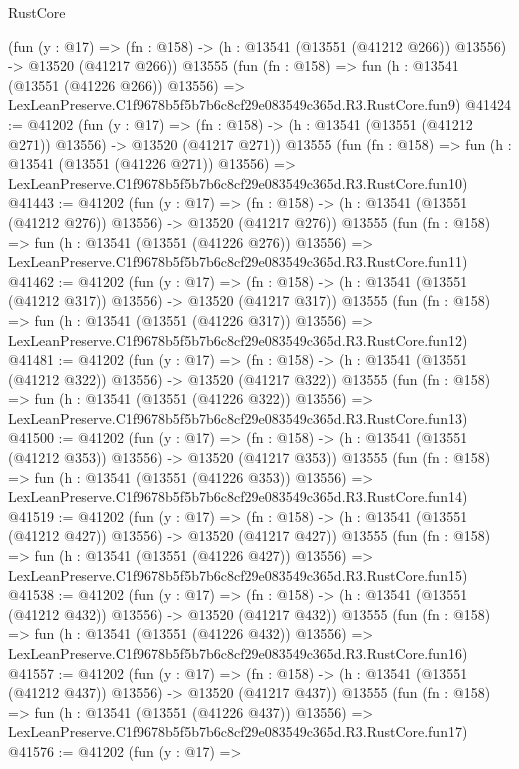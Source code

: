 \begin{lexlean}{RustCore}
\begin{coremodule}
    (fun (y : @17) =>
    (fn : @158) -> (h : @13541 (@13551 (@41212 @266)) @13556) -> @13520 (@41217 @266))
    @13555
    (fun (fn : @158) =>
    fun (h : @13541 (@13551 (@41226 @266)) @13556) =>
    LexLeanPreserve.C1f9678b5f5b7b6c8cf29e083549c365d.R3.RustCore.fun9)
@41424 := @41202
    (fun (y : @17) =>
    (fn : @158) -> (h : @13541 (@13551 (@41212 @271)) @13556) -> @13520 (@41217 @271))
    @13555
    (fun (fn : @158) =>
    fun (h : @13541 (@13551 (@41226 @271)) @13556) =>
    LexLeanPreserve.C1f9678b5f5b7b6c8cf29e083549c365d.R3.RustCore.fun10)
@41443 := @41202
    (fun (y : @17) =>
    (fn : @158) -> (h : @13541 (@13551 (@41212 @276)) @13556) -> @13520 (@41217 @276))
    @13555
    (fun (fn : @158) =>
    fun (h : @13541 (@13551 (@41226 @276)) @13556) =>
    LexLeanPreserve.C1f9678b5f5b7b6c8cf29e083549c365d.R3.RustCore.fun11)
@41462 := @41202
    (fun (y : @17) =>
    (fn : @158) -> (h : @13541 (@13551 (@41212 @317)) @13556) -> @13520 (@41217 @317))
    @13555
    (fun (fn : @158) =>
    fun (h : @13541 (@13551 (@41226 @317)) @13556) =>
    LexLeanPreserve.C1f9678b5f5b7b6c8cf29e083549c365d.R3.RustCore.fun12)
@41481 := @41202
    (fun (y : @17) =>
    (fn : @158) -> (h : @13541 (@13551 (@41212 @322)) @13556) -> @13520 (@41217 @322))
    @13555
    (fun (fn : @158) =>
    fun (h : @13541 (@13551 (@41226 @322)) @13556) =>
    LexLeanPreserve.C1f9678b5f5b7b6c8cf29e083549c365d.R3.RustCore.fun13)
@41500 := @41202
    (fun (y : @17) =>
    (fn : @158) -> (h : @13541 (@13551 (@41212 @353)) @13556) -> @13520 (@41217 @353))
    @13555
    (fun (fn : @158) =>
    fun (h : @13541 (@13551 (@41226 @353)) @13556) =>
    LexLeanPreserve.C1f9678b5f5b7b6c8cf29e083549c365d.R3.RustCore.fun14)
@41519 := @41202
    (fun (y : @17) =>
    (fn : @158) -> (h : @13541 (@13551 (@41212 @427)) @13556) -> @13520 (@41217 @427))
    @13555
    (fun (fn : @158) =>
    fun (h : @13541 (@13551 (@41226 @427)) @13556) =>
    LexLeanPreserve.C1f9678b5f5b7b6c8cf29e083549c365d.R3.RustCore.fun15)
@41538 := @41202
    (fun (y : @17) =>
    (fn : @158) -> (h : @13541 (@13551 (@41212 @432)) @13556) -> @13520 (@41217 @432))
    @13555
    (fun (fn : @158) =>
    fun (h : @13541 (@13551 (@41226 @432)) @13556) =>
    LexLeanPreserve.C1f9678b5f5b7b6c8cf29e083549c365d.R3.RustCore.fun16)
@41557 := @41202
    (fun (y : @17) =>
    (fn : @158) -> (h : @13541 (@13551 (@41212 @437)) @13556) -> @13520 (@41217 @437))
    @13555
    (fun (fn : @158) =>
    fun (h : @13541 (@13551 (@41226 @437)) @13556) =>
    LexLeanPreserve.C1f9678b5f5b7b6c8cf29e083549c365d.R3.RustCore.fun17)
@41576 := @41202
    (fun (y : @17) =>

\end{coremodule}
\end{lexlean}
